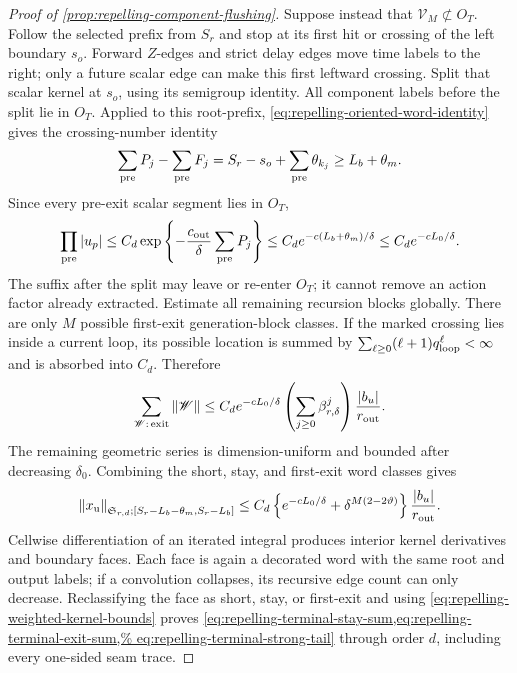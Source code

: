 \begin{proof}[Proof of
\cref{prop:repelling-component-flushing}]
Suppose instead that \(\mathcal V_M\not\subset O_T\).  Follow the selected
prefix from \(S_r\) and stop at its first hit or crossing of the left
boundary \(s_o\).  Forward \(Z\)-edges and strict delay edges move time
labels to the right; only a future scalar edge can make this first leftward
crossing.  Split that scalar kernel at \(s_o\), using its semigroup identity.
All component labels before the split lie in \(O_T\).  Applied to this
root-prefix, \cref{eq:repelling-oriented-word-identity} gives the
crossing-number identity
\begin{equation}
 \sum_{\rm pre}P_j-\sum_{\rm pre}F_j
 =S_r-s_o+\sum_{\rm pre}\theta_{k_j}
 \ge L_b+\theta_m.                                 \label{eq:repelling-terminal-first-exit-action}
\end{equation}
Since every pre-exit scalar segment lies in \(O_T\),
\begin{equation*}
 \prod_{\rm pre}|u_p|
 \le C_d\exp\left\{-\frac{c_{\rm out}}{\delta}
                   \sum_{\rm pre}P_j\right\}
 \le C_de^{-c(L_b+\theta_m)/\delta}
 \le C_de^{-cL_0/\delta}.
\end{equation*}
The suffix after the split may leave or re-enter
\(O_T\); it cannot remove an action factor already extracted.  Estimate all
remaining recursion blocks globally.  There are only \(M\) possible
first-exit generation-block classes.  If the marked crossing lies inside a
current loop, its possible location is summed by
\(\sum_{\ell\ge0}(\ell+1)q_{\rm loop}^{\ell}<\infty\) and is absorbed into
\(C_d\).  Therefore
\begin{equation}
 \sum_{\mathscr W:\,{\rm exit}}\|\mathscr W\|
 \le C_de^{-cL_0/\delta}
       \left(\sum_{j\ge0}\beta_{r,\delta}^j\right)
       \frac{|b_u|}{r_{\rm out}}.                  \label{eq:repelling-terminal-exit-sum}
\end{equation}
The remaining geometric series is dimension-uniform and bounded after
decreasing \(\delta_0\).  Combining the short, stay, and first-exit word
classes gives
\begin{equation}
 \left\|x_{\rm u}\right\|_{\mathfrak S_{r,d};
       [S_r-L_b-\theta_m,S_r-L_b]}
 \le C_d\left\{e^{-cL_0/\delta}
            +\delta^{M(2-2\vartheta)}\right\}
       \frac{|b_u|}{r_{\rm out}}.                 \label{eq:repelling-terminal-strong-tail}
\end{equation}
Cellwise differentiation of an iterated integral produces interior kernel
derivatives and boundary faces.  Each face is again a decorated word with
the same root and output labels; if a convolution collapses, its recursive
edge count can only decrease.  Reclassifying the face as short, stay, or
first-exit and using
\cref{eq:repelling-weighted-kernel-bounds} proves
\cref{eq:repelling-terminal-stay-sum,eq:repelling-terminal-exit-sum,%
eq:repelling-terminal-strong-tail} through order \(d\), including every
one-sided seam trace.


\end{proof}

